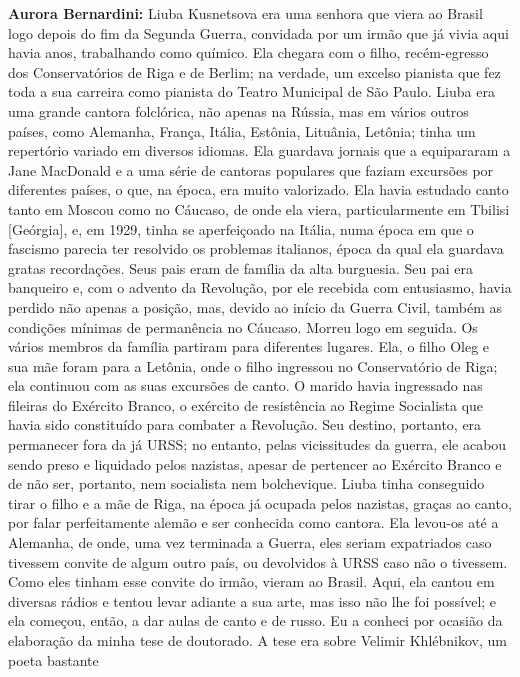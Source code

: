 \textbf{Aurora Bernardini:} Liuba Kusnetsova era uma senhora que viera
ao Brasil logo depois do fim da Segunda Guerra, convidada por um irmão
que já vivia aqui havia anos, trabalhando como químico. Ela chegara com
o filho, recém-egresso dos Conservatórios de Riga e de Berlim; na
verdade, um excelso pianista que fez toda a sua carreira como pianista
do Teatro Municipal de São Paulo. Liuba era uma grande cantora
folclórica, não apenas na Rússia, mas em vários outros países, como
Alemanha, França, Itália, Estônia, Lituânia, Letônia; tinha um
repertório variado em diversos idiomas. Ela guardava jornais que a
equipararam a Jane MacDonald e a uma série de cantoras populares que
faziam excursões por diferentes países, o que, na época, era muito
valorizado. Ela havia estudado canto tanto em Moscou como no Cáucaso, de
onde ela viera, particularmente em Tbilisi {[}Geórgia{]}, e, em 1929,
tinha se aperfeiçoado na Itália, numa época em que o fascismo parecia
ter resolvido os problemas italianos, época da qual ela guardava gratas
recordações. Seus pais eram de família da alta burguesia. Seu pai era
banqueiro e, com o advento da Revolução, por ele recebida com
entusiasmo, havia perdido não apenas a posição, mas, devido ao início da
Guerra Civil, também as condições mínimas de permanência no Cáucaso.
Morreu logo em seguida. Os vários membros da família partiram para
diferentes lugares. Ela, o filho Oleg e sua mãe foram para a Letônia,
onde o filho ingressou no Conservatório de Riga; ela continuou com as
suas excursões de canto. O marido havia ingressado nas fileiras do
Exército Branco, o exército de resistência ao Regime Socialista que
havia sido constituído para combater a Revolução. Seu destino, portanto,
era permanecer fora da já URSS; no entanto, pelas vicissitudes da
guerra, ele acabou sendo preso e liquidado pelos nazistas, apesar de
pertencer ao Exército Branco e de não ser, portanto, nem socialista nem
bolchevique. Liuba tinha conseguido tirar o filho e a mãe de Riga, na
época já ocupada pelos nazistas, graças ao canto, por falar
perfeitamente alemão e ser conhecida como cantora. Ela levou-os até a
Alemanha, de onde, uma vez terminada a Guerra, eles seriam expatriados
caso tivessem convite de algum outro país, ou devolvidos à URSS caso não
o tivessem. Como eles tinham esse convite do irmão, vieram ao Brasil.
Aqui, ela cantou em diversas rádios e tentou levar adiante a sua arte,
mas isso não lhe foi possível; e ela começou, então, a dar aulas de
canto e de russo. Eu a conheci por ocasião da elaboração da minha tese
de doutorado. A tese era sobre Velimir Khlébnikov, um poeta bastante

